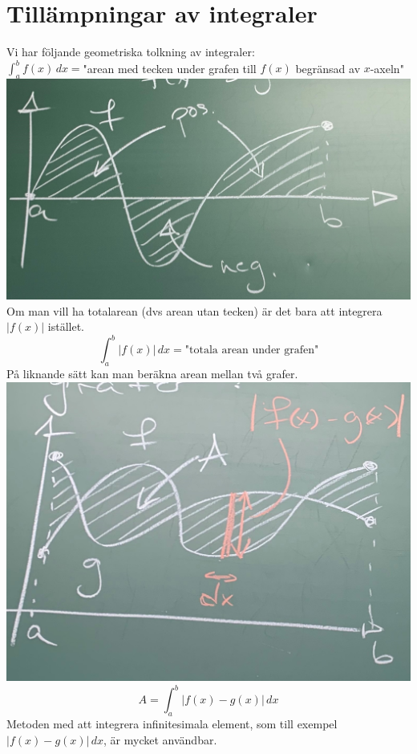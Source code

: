 \chapter{Tillämpningar av integraler}
Vi har följande geometriska tolkning av integraler:\\
$\int_a^bf(x)\, dx=$"arean med tecken under grafen till $f(x)$ begränsad av $x$-axeln"\\
\includegraphics[scale=0.1]{lessons/lesson19/imgs/img01.jpg}
Om man vill ha totalarean (dvs arean utan tecken) är det bara att integrera $|f(x)|$ istället.
\begin{equation*}
    \int_a^b|f(x)|\, dx=\text{"totala arean under grafen"}
\end{equation*}
På liknande sätt kan man beräkna arean mellan två grafer.
\includegraphics[scale=0.1]{lessons/lesson19/imgs/img02.jpg}
\begin{equation*}
    A=\int_a^b|f(x)-g(x)|\, dx
\end{equation*}
Metoden med att integrera infinitesimala element, som till exempel $|f(x)-g(x)|\,dx$, är mycket användbar.

